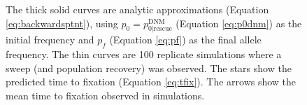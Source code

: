 \documentclass[]{article}
\begin{document}
\begin{figure}[htbp]
{The thick solid curves are analytic approximations (Equation \ref{eq:backwardsptnt}), using $p_0 = p_{0|\mathrm{rescue}}^\mathrm{DNM}$ (Equation \ref{eq:p0dnm}) as the initial frequency and $p_f$ (Equation \ref{eq:pf}) as the final allele frequency.
The thin curves are 100 replicate simulations where a sweep (and population recovery) was observed.
The stars show the predicted time to fixation (Equation \ref{eq:tfix}).
The arrows show the mean time to fixation observed in simulations. 
}%
\label{fig:rescueDNM_dynamics}
\end{figure}

\begin{figure}[htbp]
\centering
{}
\end{figure}
\end{document}
